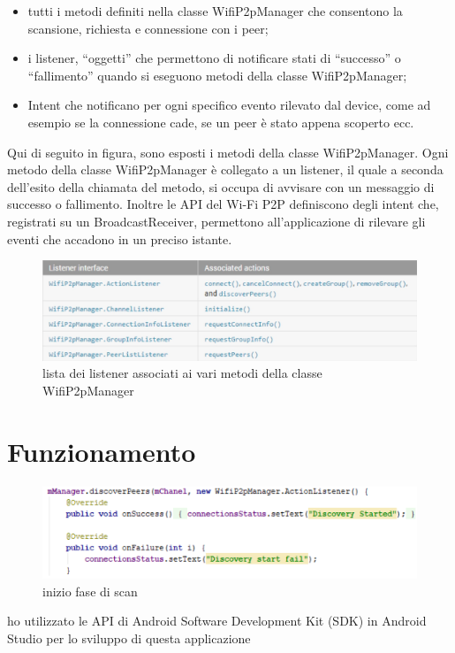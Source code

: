 \begin{itemize}
    \item tutti i metodi definiti nella classe WifiP2pManager che 
    consentono la scansione,
    richiesta e connessione con i peer;
    \item i listener, “oggetti” che permettono di notificare 
    stati di “successo” o
    “fallimento” quando si eseguono metodi della classe WifiP2pManager;
    \item Intent che notificano per ogni 
    specifico evento rilevato dal device, come ad
    esempio se la connessione cade, se un peer è stato appena scoperto ecc.
\end{itemize}
Qui di seguito in figura, sono esposti i metodi della classe WifiP2pManager.
Ogni metodo della classe WifiP2pManager è collegato a un listener, il quale a
seconda dell’esito della chiamata del metodo, si occupa di avvisare con un
messaggio di successo o fallimento.
Inoltre le API del Wi-Fi P2P definiscono degli intent che, registrati su un
BroadcastReceiver, permettono all’applicazione di rilevare gli eventi che
accadono in un preciso istante.
\begin{figure}
    \centering
    \caption{lista dei listener associati ai vari metodi della classe WifiP2pManager}
    \includegraphics[width=1\columnwidth]{imgs/listenerwifip2pmanager.jpg}
\end{figure}




\section{Funzionamento}
\begin{figure}
    \centering
    \caption{inizio fase di scan}
    \includegraphics[width=1\columnwidth]{imgs/discoveryStart.png} %
\end{figure}
ho utilizzato le API di Android Software Development Kit (SDK)
 in Android Studio \cite{ASD} per lo sviluppo di questa applicazione

